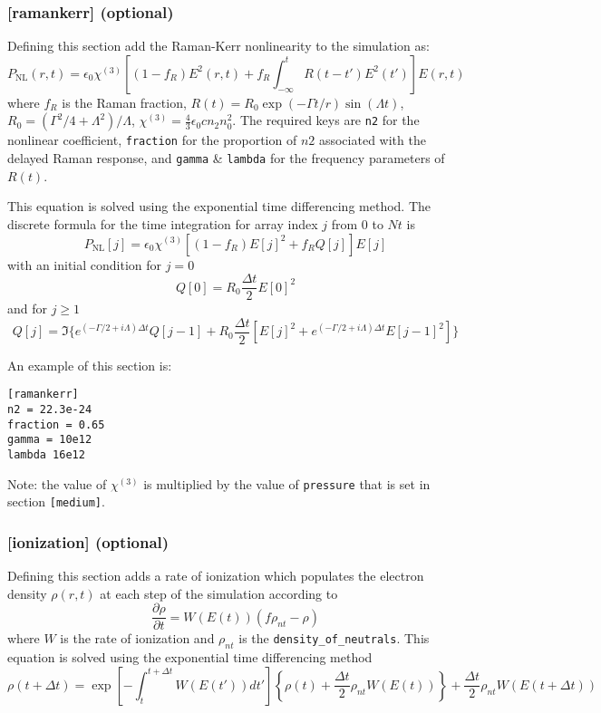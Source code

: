 \documentclass{article}
\begin{document}
\subsubsection{[ramankerr] (optional)}
Defining this section add the Raman-Kerr nonlinearity to the
simulation as:
\[P_{\mathrm{NL}}(r,t) = \epsilon_0 \chi^{(3)} \left[(1-f_R) E^2(r,t)
    + f_R\int_{-\infty}^t R(t-t') E^2(t')\right] E(r,t)\] where $f_R$
is the Raman fraction, $R(t) = R_0 \exp(-\Gamma t/r) \sin(\Lambda t)$,
$R_0 = (\Gamma^2/4 + \Lambda^2) / \Lambda$,
$\chi^{(3)} = \frac43 \epsilon_0 c n_2 n_0^2$.  The required keys are
\texttt{n2} for the nonlinear coefficient, \texttt{fraction} for the
proportion of $n2$ associated with the delayed Raman response, and
\texttt{gamma} \& \texttt{lambda} for the frequency parameters of
$R(t)$.

This equation is solved using the exponential time differencing
method. The discrete formula for the time integration for array index
$j$ from 0 to $Nt$ is
\[P_{\mathrm{NL}}[j] = \epsilon_0 \chi^{(3)} \left[(1-f_R) E[j]^2 + f_R Q[j]\right] E[j] \]
with an initial condition for $j = 0$
\[Q[0] = R_0 \frac{\Delta t}{2} E[0]^2\]
and for $j \ge 1$
\[Q[j] = \Im\bigg\{e^{(-\Gamma/2 + i\Lambda)\Delta t} Q[j-1] + R_0\frac{\Delta t}{2} \left[E[j]^2 + e^{(-\Gamma/2 + i\Lambda)\Delta t} E[j-1]^2\right]\bigg\}\]

An example of this section is:
\begin{lstlisting}
[ramankerr]
n2 = 22.3e-24
fraction = 0.65
gamma = 10e12
lambda 16e12
\end{lstlisting}


Note: the value of
$\chi^{(3)}$ is multiplied by the value of \texttt{pressure} that is
set in section \texttt{[medium]}.

\subsubsection{[ionization] (optional)}
Defining this section adds a rate of ionization which populates the
electron density $\rho(r,t)$ at each step of the simulation according to
\[\frac{\partial \rho}{\partial t} = W(E(t)) (f\rho_{nt}-\rho)\]
where $W$ is the rate of ionization and $\rho_{nt}$ is the
\texttt{density\_of\_neutrals}.  This equation is solved using the
exponential time differencing method
\[\rho(t+\Delta t) = \exp\left[-\int_t^{t+\Delta t} W(E(t')) dt'\right]\left\{\rho(t) + \frac{\Delta t}{2} \rho_{nt}W(E(t))\right\} + \frac{\Delta t}{2} \rho_{nt} W(E(t+\Delta t))\]
\end{document}
